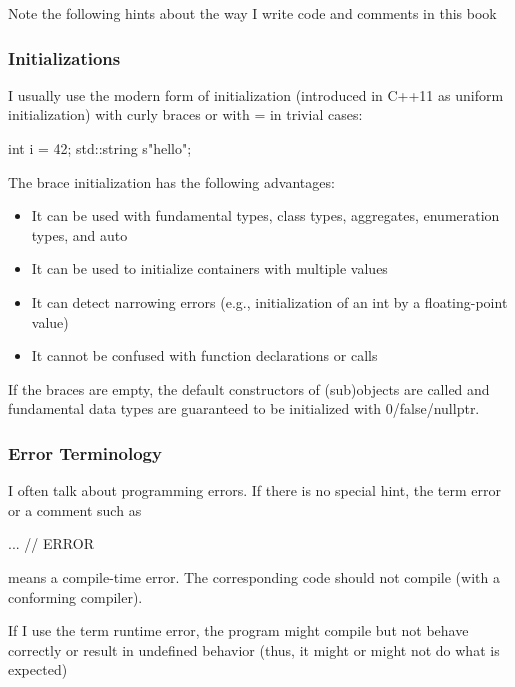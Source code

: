 
Note the following hints about the way I write code and comments in this book

\subsubsection*{ Initializations}

I usually use the modern form of initialization (introduced in C++11 as uniform initialization) with curly braces or with = in trivial cases:

\begin{cpp}
int i = 42;
std::string s{"hello"};
\end{cpp}

The brace initialization has the following advantages:

\begin{itemize}
\item
It can be used with fundamental types, class types, aggregates, enumeration types, and auto

\item
It can be used to initialize containers with multiple values

\item
It can detect narrowing errors (e.g., initialization of an int by a floating-point value)

\item
It cannot be confused with function declarations or calls
\end{itemize}

If the braces are empty, the default constructors of (sub)objects are called and fundamental data types are guaranteed to be initialized with 0/false/nullptr.


\subsubsection*{ Error Terminology}

I often talk about programming errors. If there is no special hint, the term error or a comment such as

\begin{cpp}
... // ERROR
\end{cpp}

means a compile-time error. The corresponding code should not compile (with a conforming compiler).

If I use the term runtime error, the program might compile but not behave correctly or result in undefined behavior (thus, it might or might not do what is expected)

